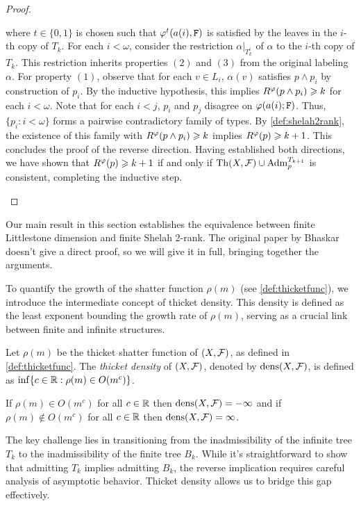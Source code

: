 \begin{proof}
\begin{outline}
        where $t\in\{0,1\}$ is chosen such that $\varphi^t(a(i),\texttt{F})$ is satisfied by the leaves in the $i$-th copy of $T_k$. 
        \2 For each $i<\omega$, consider the restriction $\alpha|_{T_k^i}$ of $\alpha$ to the $i$-th copy of $T_k$. This restriction inherits properties $(2)$ and $(3)$ from the original labeling $\alpha$. For property $(1)$, observe that for each $v\in L_i$, $\alpha(v)$ satisfies $p\land p_i$ by construction of $p_i$. 
        \2 By the inductive hypothesis, this implies $R^\varphi(p \land p_i) \geqslant k$ for each $i<\omega$. Note that for each $i<j$, $p_i$ and $p_j$ disagree on $\varphi(a(i); \texttt{F})$. Thus, $\{p_i : i < \omega\}$ forms a pairwise contradictory family of types. By \cref{def:shelah2rank}, the existence of this family with $R^\varphi(p \land p_i)\geqslant k$ implies $R^\varphi(p) \geqslant k+1$. This concludes the proof of the reverse direction.
\0 Having established both directions, we have shown that $R^\varphi(p) \geqslant k+1$ if and only if $\operatorname{Th}(X,\mathcal{F})\cup \operatorname{Adm}^{T_{k+1}}_{p}$ is consistent, completing the inductive step.
\end{outline}
\end{proof}

Our main result in this section establishes the equivalence between finite Littlestone dimension and finite Shelah 2-rank.
The original paper by Bhaskar \cite{Bhaskar2021} doesn't give a direct proof, so we will give it in full, bringing together the arguments.

To quantify the growth of the shatter function $\rho(m)$ (see \cref{def:thicketfunc}), we introduce the intermediate concept of thicket density. This density is defined as the least exponent bounding the growth rate of $\rho(m)$, serving as a crucial link between finite and infinite structures.

\begin{definition}
\label{def:thicketDens}
\begin{outline}
\0 Let $\rho(m)$ be the thicket shatter function of $(X,\mathcal{F})$, as defined in \cref{def:thicketfunc}. The \emph{thicket density} of $(X,\mathcal{F})$, denoted by $\operatorname{dens}(X,\mathcal{F})$, is defined as $\inf\{c\in \mathbb{R} : \rho(m) \in O(m^c)\}$. 

\0 If $\rho(m) \in O(m^c)$ for all $c\in\mathbb{R}$ then $\operatorname{dens}(X,\mathcal{F})=-\infty$ and if $\rho(m) \not\in O(m^c)$ for all $c\in\mathbb{R}$ then $\operatorname{dens}(X,\mathcal{F})=\infty$.
\end{outline}
\end{definition}

The key challenge lies in transitioning from the inadmissibility of the infinite tree $T_k$ to the inadmissibility of the finite tree $B_k$. While it's straightforward to show that admitting $T_k$ implies admitting $B_k$, the reverse implication requires careful analysis of asymptotic behavior. Thicket density allows us to bridge this gap effectively.

